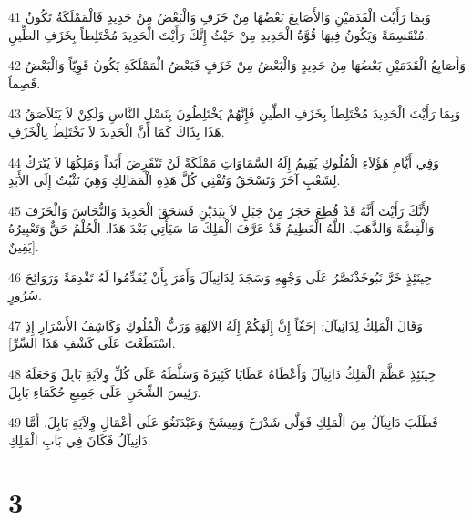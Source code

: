 \par 41 وَبِمَا رَأَيْتَ الْقَدَمَيْنِ وَالأَصَابِعَ بَعْضُهَا مِنْ خَزَفٍ وَالْبَعْضُ مِنْ حَدِيدٍ فَالْمَمْلَكَةُ تَكُونُ مُنْقَسِمَةً وَيَكُونُ فِيهَا قُوَّةُ الْحَدِيدِ مِنْ حَيْثُ إِنَّكَ رَأَيْتَ الْحَدِيدَ مُخْتَلِطاً بِخَزَفِ الطِّينِ.
\par 42 وَأَصَابِعُ الْقَدَمَيْنِ بَعْضُهَا مِنْ حَدِيدٍ وَالْبَعْضُ مِنْ خَزَفٍ فَبَعْضُ الْمَمْلَكَةِ يَكُونُ قَوِيّاً وَالْبَعْضُ قَصِماً.
\par 43 وَبِمَا رَأَيْتَ الْحَدِيدَ مُخْتَلِطاً بِخَزَفِ الطِّينِ فَإِنَّهُمْ يَخْتَلِطُونَ بِنَسْلِ النَّاسِ وَلَكِنْ لاَ يَتَلاَصَقُ هَذَا بِذَاكَ كَمَا أَنَّ الْحَدِيدَ لاَ يَخْتَلِطُ بِالْخَزَفِ.
\par 44 وَفِي أَيَّامِ هَؤُلاَءِ الْمُلُوكِ يُقِيمُ إِلَهُ السَّمَاوَاتِ مَمْلَكَةً لَنْ تَنْقَرِضَ أَبَداً وَمَلِكُهَا لاَ يُتْرَكُ لِشَعْبٍ آخَرَ وَتَسْحَقُ وَتُفْنِي كُلَّ هَذِهِ الْمَمَالِكِ وَهِيَ تَثْبُتُ إِلَى الأَبَدِ.
\par 45 لأَنَّكَ رَأَيْتَ أَنَّهُ قَدْ قُطِعَ حَجَرٌ مِنْ جَبَلٍ لاَ بِيَدَيْنِ فَسَحَقَ الْحَدِيدَ وَالنُّحَاسَ وَالْخَزَفَ وَالْفِضَّةَ وَالذَّهَبَ. اللَّهُ الْعَظِيمُ قَدْ عَرَّفَ الْمَلِكَ مَا سَيَأْتِي بَعْدَ هَذَا. الْحُلْمُ حَقٌّ وَتَعْبِيرُهُ يَقِينٌ].
\par 46 حِينَئِذٍ خَرَّ نَبُوخَذْنَصَّرُ عَلَى وَجْهِهِ وَسَجَدَ لِدَانِيآلَ وَأَمَرَ بِأَنْ يُقَدِّمُوا لَهُ تَقْدِمَةً وَرَوَائِحَ سُرُورٍ.
\par 47 وَقَالَ الْمَلِكُ لِدَانِيآلَ: [حَقّاً إِنَّ إِلَهَكُمْ إِلَهُ الآلِهَةِ وَرَبُّ الْمُلُوكِ وَكَاشِفُ الأَسْرَارِ إِذِ اسْتَطَعْتَ عَلَى كَشْفِ هَذَا السِّرِّ].
\par 48 حِينَئِذٍ عَظَّمَ الْمَلِكُ دَانِيآلَ وَأَعْطَاهُ عَطَايَا كَثِيرَةً وَسَلَّطَهُ عَلَى كُلِّ وِلاَيَةِ بَابِلَ وَجَعَلَهُ رَئِيسَ الشِّحَنِ عَلَى جَمِيعِ حُكَمَاءِ بَابِلَ.
\par 49 فَطَلَبَ دَانِيآلُ مِنَ الْمَلِكِ فَوَلَّى شَدْرَخَ وَمِيشَخَ وَعَبْدَنَغُوَ عَلَى أَعْمَالِ وِلاَيَةِ بَابِلَ. أَمَّا دَانِيآلُ فَكَانَ فِي بَابِ الْمَلِكِ.

\chapter{3}

